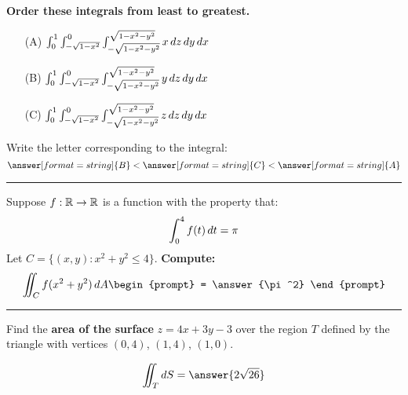 \documentclass{ximera}
\begin{document}
\begin{problem}
  \textbf{Order these integrals from least to greatest.}
  \begin{enumerate}
  \item[(A)] $\int_0^1 \int_{-\sqrt{1-x^2}}^0\int_{-\sqrt{1-x^2-y^2}}^{\sqrt{1-x^2-y^2}} x \mathop{}\!d z \mathop{}\!d y \mathop{}\!d x$
  \item[(B)] $\int_0^1 \int_{-\sqrt{1-x^2}}^0\int_{-\sqrt{1-x^2-y^2}}^{\sqrt{1-x^2-y^2}} y \mathop{}\!d z \mathop{}\!d y \mathop{}\!d x$
  \item[(C)] $\int_0^1 \int_{-\sqrt{1-x^2}}^0\int_{-\sqrt{1-x^2-y^2}}^{\sqrt{1-x^2-y^2}} z \mathop{}\!d z \mathop{}\!d y \mathop{}\!d x$ 
  \end{enumerate}
  \begin{prompt}
    Write the letter corresponding to the integral:
    \[
    \answer[format=string]{B} < \answer[format=string]{C} < \answer[format=string]{A}
    \]
  \end{prompt}
\end{problem}

\hrule

\begin{problem}
  Suppose $f:\mathbb R\to\mathbb R$ is a function with the property that:
  \[
  \int_0^4 f(t) \mathop{}\!d t = \pi
  \]
  Let $C = \{(x,y): x^2+y^2 \le 4\}$. \textbf{Compute:}
  \[
  \iint_C f(x^2 + y^2) \d A
  \begin{prompt}
    = \answer{\pi^2}
      \end{prompt}
  \]
  \vfill
\end{problem}

\hrule

\begin{problem}
  Find the \textbf{area of the surface} $z= 4x + 3y -3$ over the region $T$
  defined by the triangle with vertices $(0,4)$, $(1,4)$, $(1,0)$.
  \begin{prompt}
    \[
    \iint_T \d S = \answer{2 \sqrt{26}}
    \]
  \end{prompt}  
\end{problem}
\vfill
\end{document}
